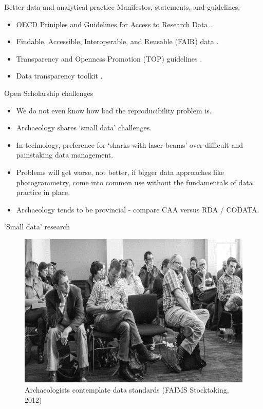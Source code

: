 \documentclass[aspectratio=169, 11pt]{beamer} %
\begin{document}
\begin{frame}{Better data and analytical practice}
  Manifestos, statements, and guidelines:
    \begin{itemize}[label=\textbullet]
        \item OECD Priniples and Guidelines for Access to Research Data \cite{Oecd2007-vi}.
        \item Findable, Accessible, Interoperable, and Reusable (FAIR) data \cite{Wilkinson2016-mr, Go-fair2017-vs}.
        \item Transparency and Openness Promotion (TOP) guidelines \cite{Nosek2015-wm, Cos2019-mr}.
        \item Data transparency toolkit \cite{Perkel2018-rw}.
    \end{itemize}
\end{frame}

\begin{frame}{Open Scholarship challenges}
    \begin{itemize}[label=\textbullet]
        \item We do not even know how bad the reproducibility problem is.
        \item Archaeology shares `small data' challenges.
        \item In technology, preference for `sharks with laser beams' over difficult and painstaking data management. 
        \item Problems will get worse, not better, if bigger data approaches like photogrammetry, come into common use without the fundamentals of data practice in place.
        \item Archaeology tends to be provincial - compare CAA versus RDA / CODATA. 
    \end{itemize}
\end{frame}

\begin{frame}{`Small data' research}
 \begin{figure}[H]
    \centering
        \includegraphics[height=.75\textheight]{figures/Archaeologists-standards.png}
        \caption{Archaeologists contemplate data standards (FAIMS Stocktaking, 2012)}
        \label{fig:figure7}
 \end{figure}
\end{frame}
\end{document}
